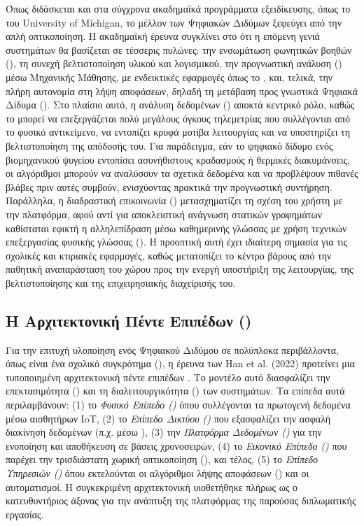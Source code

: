 Όπως διδάσκεται και στα σύγχρονα ακαδημαϊκά προγράμματα εξειδίκευσης, όπως το  του University of Michigan, το μέλλον των Ψηφιακών Διδύμων ξεφεύγει από την απλή οπτικοποίηση. Η ακαδημαϊκή έρευνα συγκλίνει στο ότι η επόμενη γενιά συστημάτων θα βασίζεται σε τέσσερις πυλώνες: την ενσωμάτωση φωνητικών βοηθών (), τη συνεχή βελτιστοποίηση υλικού και λογισμικού, την προγνωστική ανάλυση () μέσω Μηχανικής Μάθησης, με ενδεικτικές εφαρμογές όπως το , και, τελικά, την πλήρη αυτονομία στη λήψη αποφάσεων, δηλαδή τη μετάβαση προς γνωστικά Ψηφιακά Δίδυμα (). Στο πλαίσιο αυτό, η ανάλυση δεδομένων () αποκτά κεντρικό ρόλο, καθώς το  μπορεί να επεξεργάζεται πολύ μεγάλους όγκους τηλεμετρίας που συλλέγονται από το φυσικό αντικείμενο, να εντοπίζει κρυφά μοτίβα λειτουργίας και να υποστηρίζει τη βελτιστοποίηση της απόδοσής του. Για παράδειγμα, εάν το ψηφιακό δίδυμο ενός βιομηχανικού ψυγείου εντοπίσει ασυνήθιστους κραδασμούς ή θερμικές διακυμάνσεις, οι αλγόριθμοι  μπορούν να αναλύσουν τα σχετικά δεδομένα και να προβλέψουν πιθανές βλάβες πριν αυτές συμβούν, ενισχύοντας πρακτικά την προγνωστική συντήρηση. Παράλληλα, η διαδραστική επικοινωνία () μετασχηματίζει τη σχέση του χρήστη με την πλατφόρμα, αφού αντί για αποκλειστική ανάγνωση στατικών γραφημάτων καθίσταται εφικτή η αλληλεπίδραση μέσω καθημερινής γλώσσας με χρήση τεχνικών επεξεργασίας φυσικής γλώσσας (). Η προοπτική αυτή έχει ιδιαίτερη σημασία για τις σχολικές και κτιριακές εφαρμογές, καθώς μετατοπίζει το κέντρο βάρους από την παθητική αναπαράσταση του χώρου προς την ενεργή υποστήριξη της λειτουργίας, της βελτιστοποίησης και της επιχειρησιακής διαχείρισής του.

\subsection{Η Αρχιτεκτονική Πέντε Επιπέδων ()}
Για την επιτυχή υλοποίηση ενός Ψηφιακού Διδύμου σε πολύπλοκα περιβάλλοντα, όπως είναι ένα σχολικό συγκρότημα (), η έρευνα των Han et al. (2022) προτείνει μια τυποποιημένη αρχιτεκτονική πέντε επιπέδων \cite{Han2022}. Το μοντέλο αυτό διασφαλίζει την επεκτασιμότητα () και τη διαλειτουργικότητα () των συστημάτων. Τα επίπεδα αυτά περιλαμβάνουν: (1) το \textit{Φυσικό Επίπεδο ()} όπου συλλέγονται τα πρωτογενή δεδομένα μέσω αισθητήρων IoT, (2) το \textit{Επίπεδο Δικτύου ()} που εξασφαλίζει την ασφαλή διακίνηση δεδομένων (π.χ. μέσω ), (3) την \textit{Πλατφόρμα Δεδομένων ()} για την ενοποίηση και αποθήκευση σε βάσεις χρονοσειρών, (4) το \textit{Εικονικό Επίπεδο ()} που παρέχει την τρισδιάστατη χωρική οπτικοποίηση (), και τέλος, (5) το \textit{Επίπεδο Υπηρεσιών ()} όπου εκτελούνται οι αλγόριθμοι λήψης αποφάσεων () και οι αυτοματισμοί. Η συγκεκριμένη αρχιτεκτονική υιοθετήθηκε πλήρως ως ο κατευθυντήριος άξονας για την ανάπτυξη της πλατφόρμας της παρούσας διπλωματικής εργασίας.

